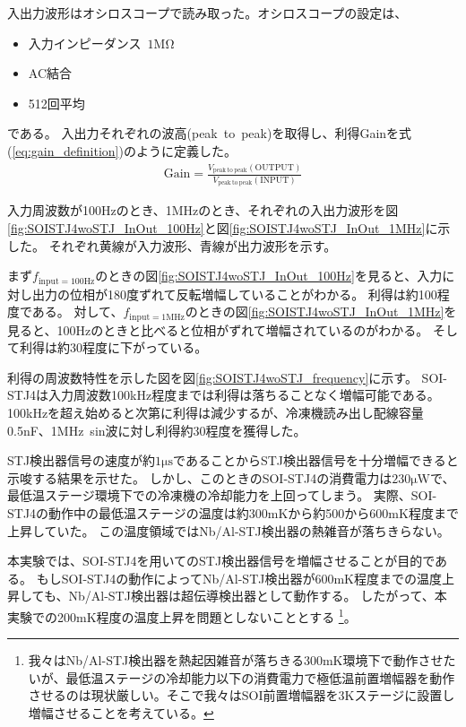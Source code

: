 			入出力波形はオシロスコープで読み取った。オシロスコープの設定は、
			\begin{itemize}
				\item 入力インピーダンス\ $1\mathrm{M \Omega}$
				\item AC結合
				\item 512回平均
			\end{itemize}
			である。
			入出力それぞれの波高(peak\ to\ peak)を取得し、利得Gainを式(\ref{eq:gain_definition})のように定義した。
			\begin{eqnarray}
				\mathrm{Gain} = \frac{V_{\mathrm{peak\ to\ peak}}(\mathrm{OUTPUT})}{V_{\mathrm{peak\ to\ peak}}(\mathrm{INPUT})}
				\label{eq:gain_definition}
			\end{eqnarray}
			
			\clearpage
			入力周波数が100Hzのとき、1MHzのとき、それぞれの入出力波形を図\ref{fig:SOISTJ4woSTJ_InOut_100Hz}と図\ref{fig:SOISTJ4woSTJ_InOut_1MHz}に示した。
			それぞれ黄線が入力波形、青線が出力波形を示す。
			
			まず$f_{\mathrm{input}=100\mathrm{Hz}}$のときの図\ref{fig:SOISTJ4woSTJ_InOut_100Hz}を見ると、入力に対し出力の位相が180度ずれて反転増幅していることがわかる。
			利得は約100程度である。
			対して、$f_{\mathrm{input}=1\mathrm{MHz}}$のときの図\ref{fig:SOISTJ4woSTJ_InOut_1MHz}を見ると、100Hzのときと比べると位相がずれて増幅されているのがわかる。
			そして利得は約30程度に下がっている。
			
			利得の周波数特性を示した図を図\ref{fig:SOISTJ4woSTJ_frequency}に示す。
			SOI-STJ4は入力周波数100kHz程度までは利得は落ちることなく増幅可能である。
			100kHzを超え始めると次第に利得は減少するが、冷凍機読み出し配線容量0.5nF、1MHz\ sin波に対し利得約30程度を獲得した。
			
			STJ検出器信号の速度が約$1\mathrm{\mu s}$であることからSTJ検出器信号を十分増幅できると示唆する結果を示せた。
			しかし、このときのSOI-STJ4の消費電力は$230\mathrm{\mu W}$で、最低温ステージ環境下での冷凍機の冷却能力を上回ってしまう。
			実際、SOI-STJ4の動作中の最低温ステージの温度は約300mKから約500から600mK程度まで上昇していた。
			この温度領域ではNb/Al-STJ検出器の熱雑音が落ちきらない。
			
			本実験では、SOI-STJ4を用いてのSTJ検出器信号を増幅させることが目的である。
			もしSOI-STJ4の動作によってNb/Al-STJ検出器が600mK程度までの温度上昇しても、Nb/Al-STJ検出器は超伝導検出器として動作する。
			したがって、本実験での200mK程度の温度上昇を問題としないこととする
			\footnote{我々はNb/Al-STJ検出器を熱起因雑音が落ちきる300mK環境下で動作させたいが、最低温ステージの冷却能力以下の消費電力で極低温前置増幅器を動作させるのは現状厳しい。そこで我々はSOI前置増幅器を3Kステージに設置し増幅させることを考えている。}。
			
